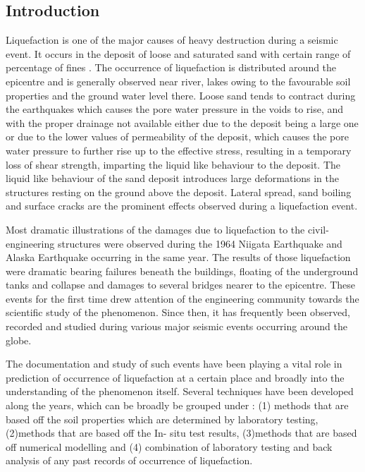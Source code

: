 \subsection{Introduction}
Liquefaction is one of the major causes of heavy destruction during a seismic event. It occurs in the deposit of loose and saturated sand with certain range of percentage of fines \cite{r11}. The occurrence of liquefaction is distributed around the epicentre and is generally observed near river, lakes owing to the favourable soil properties and the ground water level there.  Loose sand tends to contract during the earthquakes which causes the pore water pressure in the voids to rise, and with the proper drainage not available either due to the deposit being a large one or due to the lower values of permeability of the deposit, which causes the pore water pressure to further rise up to the effective stress, resulting in a temporary loss of shear strength, imparting the liquid like behaviour to the deposit. The liquid like behaviour of the sand deposit introduces large deformations in the structures resting on the ground above the deposit. Lateral spread, sand boiling and surface cracks are the prominent effects observed during a liquefaction event.

Most dramatic illustrations of the damages due to liquefaction to the civil-engineering structures were observed during the 1964 Niigata Earthquake and Alaska Earthquake occurring in the same year. The results of those liquefaction were dramatic bearing failures beneath the buildings, floating of the underground tanks and collapse and damages to several bridges nearer to the epicentre. These events for the first time drew attention of the engineering community towards the scientific study of the phenomenon. Since then, it has frequently been observed, recorded and studied during various major seismic events occurring around the globe. 

The documentation and study of such events have been playing a vital role in prediction of occurrence of liquefaction at a certain place and broadly into the understanding of the phenomenon itself. Several techniques have been developed along the years, which can be broadly be grouped under : (1) methods that are based off the soil properties which are determined by laboratory testing, (2)methods that are based off the In- situ test results, (3)methods that are based off numerical modelling and (4) combination of laboratory testing and back analysis of any past records of occurrence of liquefaction.

